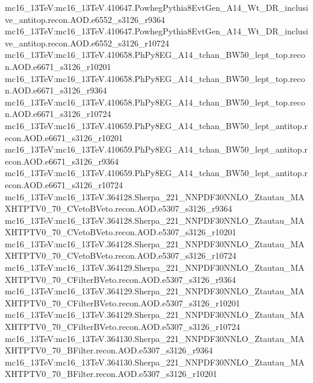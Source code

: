 { mc16\_13TeV:mc16\_13TeV.410647.PowhegPythia8EvtGen\_A14\_Wt\_DR\_inclusive\_antitop.recon.AOD.e6552\_s3126\_r9364   \newline 
 mc16\_13TeV:mc16\_13TeV.410647.PowhegPythia8EvtGen\_A14\_Wt\_DR\_inclusive\_antitop.recon.AOD.e6552\_s3126\_r10724   \newline 
 mc16\_13TeV:mc16\_13TeV.410658.PhPy8EG\_A14\_tchan\_BW50\_lept\_top.recon.AOD.e6671\_s3126\_r10201   \newline 
 mc16\_13TeV:mc16\_13TeV.410658.PhPy8EG\_A14\_tchan\_BW50\_lept\_top.recon.AOD.e6671\_s3126\_r9364   \newline
 mc16\_13TeV:mc16\_13TeV.410658.PhPy8EG\_A14\_tchan\_BW50\_lept\_top.recon.AOD.e6671\_s3126\_r10724   \newline 
 mc16\_13TeV:mc16\_13TeV.410659.PhPy8EG\_A14\_tchan\_BW50\_lept\_antitop.recon.AOD.e6671\_s3126\_r10201   \newline 
 mc16\_13TeV:mc16\_13TeV.410659.PhPy8EG\_A14\_tchan\_BW50\_lept\_antitop.recon.AOD.e6671\_s3126\_r9364   \newline 
 mc16\_13TeV:mc16\_13TeV.410659.PhPy8EG\_A14\_tchan\_BW50\_lept\_antitop.recon.AOD.e6671\_s3126\_r10724   \newline 
 mc16\_13TeV:mc16\_13TeV.364128.Sherpa\_221\_NNPDF30NNLO\_Ztautau\_MAXHTPTV0\_70\_CVetoBVeto.recon.AOD.e5307\_s3126\_r9364\newline    
 mc16\_13TeV:mc16\_13TeV.364128.Sherpa\_221\_NNPDF30NNLO\_Ztautau\_MAXHTPTV0\_70\_CVetoBVeto.recon.AOD.e5307\_s3126\_r10201 \newline   
 mc16\_13TeV:mc16\_13TeV.364128.Sherpa\_221\_NNPDF30NNLO\_Ztautau\_MAXHTPTV0\_70\_CVetoBVeto.recon.AOD.e5307\_s3126\_r10724   \newline 
 mc16\_13TeV:mc16\_13TeV.364129.Sherpa\_221\_NNPDF30NNLO\_Ztautau\_MAXHTPTV0\_70\_CFilterBVeto.recon.AOD.e5307\_s3126\_r9364   \newline 
 mc16\_13TeV:mc16\_13TeV.364129.Sherpa\_221\_NNPDF30NNLO\_Ztautau\_MAXHTPTV0\_70\_CFilterBVeto.recon.AOD.e5307\_s3126\_r10201   \newline 
 mc16\_13TeV:mc16\_13TeV.364129.Sherpa\_221\_NNPDF30NNLO\_Ztautau\_MAXHTPTV0\_70\_CFilterBVeto.recon.AOD.e5307\_s3126\_r10724 \newline   
 mc16\_13TeV:mc16\_13TeV.364130.Sherpa\_221\_NNPDF30NNLO\_Ztautau\_MAXHTPTV0\_70\_BFilter.recon.AOD.e5307\_s3126\_r9364 \newline   
 mc16\_13TeV:mc16\_13TeV.364130.Sherpa\_221\_NNPDF30NNLO\_Ztautau\_MAXHTPTV0\_70\_BFilter.recon.AOD.e5307\_s3126\_r10201   \newline 
}
